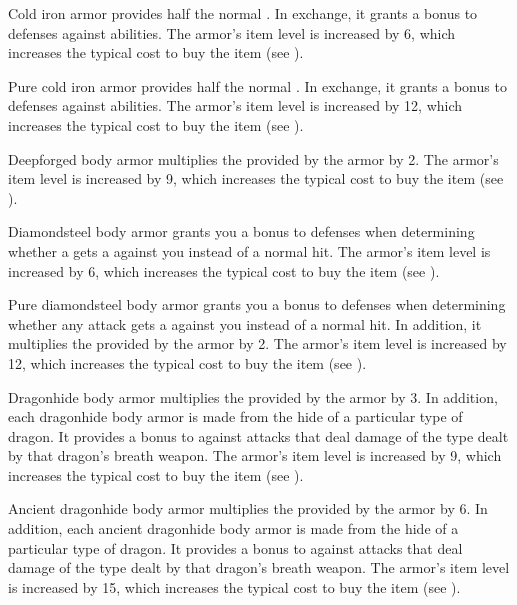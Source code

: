          Cold iron armor provides half the normal .
        In exchange, it grants a  bonus to defenses against  abilities.
        The armor's item level is increased by 6, which increases the typical cost to buy the item (see ).

         Pure cold iron armor provides half the normal .
        In exchange, it grants a  bonus to defenses against  abilities.
        The armor's item level is increased by 12, which increases the typical cost to buy the item (see ).

         Deepforged body armor multiplies the  provided by the armor by 2.
        The armor's item level is increased by 9, which increases the typical cost to buy the item (see ).

         Diamondsteel body armor grants you a  bonus to defenses when determining whether a  gets a  against you instead of a normal hit.
        The armor's item level is increased by 6, which increases the typical cost to buy the item (see ).

         Pure diamondsteel body armor grants you a  bonus to defenses when determining whether any attack gets a  against you instead of a normal hit.
        In addition, it multiplies the  provided by the armor by 2.
        The armor's item level is increased by 12, which increases the typical cost to buy the item (see ).

         Dragonhide body armor multiplies the  provided by the armor by 3.
        In addition, each dragonhide body armor is made from the hide of a particular type of dragon.
        It provides a  bonus to  against attacks that deal damage of the type dealt by that dragon's breath weapon.
        The armor's item level is increased by 9, which increases the typical cost to buy the item (see ).

         Ancient dragonhide body armor multiplies the  provided by the armor by 6.
        In addition, each ancient dragonhide body armor is made from the hide of a particular type of dragon.
        It provides a  bonus to  against attacks that deal damage of the type dealt by that dragon's breath weapon.
        The armor's item level is increased by 15, which increases the typical cost to buy the item (see ).

